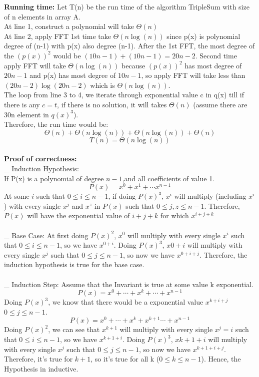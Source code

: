 \documentclass[11pt]{article}
\begin{document}
\Large{}
\noindent
\textbf{Running time:}
Let T(n) be the run time of the algorithm TripleSum with size of n elements in array A.\\
At line 1, construct a polynomial will take $\Theta(n)$\\
At line 2, apply FFT 1st time take $\Theta(n\log(n))$ since p(x) is polynomial degree of (n-1) with p(x) also degree (n-1). After the 1st FFT, the most degree of the $(p(x))^{2}$ would be $(10n-1) + (10n-1) = 20n -2$.
Second time apply FFT will take $\Theta(n \log(n)) $ because $(p(x))^2$ has most degree of $20n-1$ and p(x) has most degree of $10n-1$, so apply FFT will take less than $(20n-2)\log(20n-2)$ which is $\Theta(n\log(n))$.\\
The loop from line 3 to 4, we iterate through exponential value c in q(x) till if there is any $c = t$, if there is no solution,  it will takes $\Theta(n)$ (assume there are 30n element in $q(x)^3$).\\
Therefore, the run time would be:
$$\Theta(n) + \Theta(n\log(n)) + \Theta(n\log(n)) + \Theta(n)$$
$$\boxed{T(n) = \Theta(n\log(n))}$$
\\
\noindent
\textbf{Proof of correctness:}\\
\_ Induction Hypothesis:\\
If P(x) is a polynomial of degree $n-1$,and all coefficients of value 1.
$$P(x) = x^0 + x^1 + \cdots x^{n-1}$$
At some $i$ such that $0 \leqslant i \leqslant n-1$, if doing $P(x)^3$, $x^i$ will multiply (including $x^i$) with every single $x^j$ and $x^z$ in $P(x)$ such that $0 \leqslant j,z \leqslant n-1$. Therefore, $P(x)$ will have the exponential value of $i+j+k$ for which $x^{i+j+k}$\\
\\
\_ Base Case: At first doing $P(x)^2$, $x^0$ will multiply with every single $x^i$ such that $0 \leqslant i \leqslant n-1$, so we have $x^{0+i}$. Doing $P(x)^3$, $x{0+i}$ will multiply with every single $x^j$ such that $0 \leqslant j \leqslant n-1$, so now we have $x^{0+i+ j}$. Therefore, the induction hypothesis is true for the base case.\\
\\
\_ Induction Step: Assume that the Invariant is true at some value k exponential.\\
$$P(x) = x^0 + \cdots + x^k + \cdots + x^{n-1}$$
Doing $P(x)^3$, we know that there would be a exponential value $x^{k+i+j}$ $0 \leqslant j \leqslant n-1$.
$$P(x) = x^0 + \cdots + x^k + x^{k+1} \cdots + x^{n-1}$$
Doing $P(x)^2$, we can see that $x^{k+1}$ will multiply with every single $x^j=i$ such that $0 \leqslant i \leqslant n-1$, so we have $x^{k+1+i}$. Doing $P(x)^3$, $x{k+1+i}$ will multiply with every single $x^j$ such that $0 \leqslant j \leqslant n-1$, so now we have $x^{k+1+i+j}$. Therefore, it's true for $k+1$, so it's true for all k ($0 \leqslant k \leqslant n-1$). Hence, the Hypothesis in inductive.\\
\end{document}
